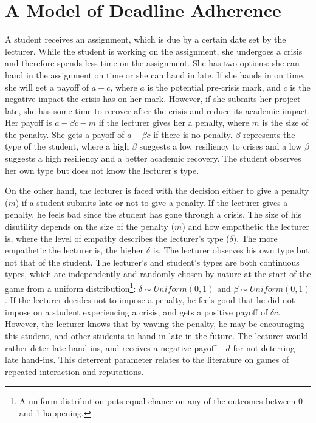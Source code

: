 \documentclass[11pt,preprint, authoryear]{elsarticle}
\numberwithin{equation}{section}
\numberwithin{figure}{section}
\numberwithin{table}{section}
\let\rmarkdownfootnote\footnote%
\def\footnote{\protect\rmarkdownfootnote}
\begin{document}
\hypertarget{a-model-of-deadline-adherence}{%
\section{\texorpdfstring{A Model of Deadline Adherence
\label{game}}{A Model of Deadline Adherence }}\label{a-model-of-deadline-adherence}}

A student receives an assignment, which is due by a certain date set by
the lecturer. While the student is working on the assignment, she
undergoes a crisis and therefore spends less time on the assignment. She
has two options: she can hand in the assignment on time or she can hand
in late. If she hands in on time, she will get a payoff of \(a-c\),
where \(a\) is the potential pre-crisis mark, and \(c\) is the negative
impact the crisis has on her mark. However, if she submits her project
late, she has some time to recover after the crisis and reduce its
academic impact. Her payoff is \(a-\beta c -m\) if the lecturer gives
her a penalty, where \(m\) is the size of the penalty. She gets a payoff
of \(a-\beta c\) if there is no penalty. \(\beta\) represents the type
of the student, where a high \(\beta\) suggests a low resiliency to
crises and a low \(\beta\) suggests a high resiliency and a better
academic recovery. The student observes her own type but does not know
the lecturer's type.

On the other hand, the lecturer is faced with the decision either to
give a penalty (\(m\)) if a student submits late or not to give a
penalty. If the lecturer gives a penalty, he feels bad since the student
has gone through a crisis. The size of his disutility depends on the
size of the penalty (\(m\)) and how empathetic the lecturer is, where
the level of empathy describes the lecturer's type (\(\delta\)). The
more empathetic the lecturer is, the higher \(\delta\) is. The lecturer
observes his own type but not that of the student. The lecturer's and
student's types are both continuous types, which are independently and
randomly chosen by nature at the start of the game from a uniform
distribution\footnote{A uniform distribution puts equal chance on any of
  the outcomes between 0 and 1 happening.}: \(\delta \sim Uniform(0,1)\)
and \(\beta \sim Uniform(0,1)\). If the lecturer decides not to impose a
penalty, he feels good that he did not impose on a student experiencing
a crisis, and gets a positive payoff of \(\delta c\). However, the
lecturer knows that by waving the penalty, he may be encouraging this
student, and other students to hand in late in the future. The lecturer
would rather deter late hand-ins, and receives a negative payoff \(-d\)
for not deterring late hand-ins. This deterrent parameter relates to the
literature on games of repeated interaction and reputations.
\end{document}
